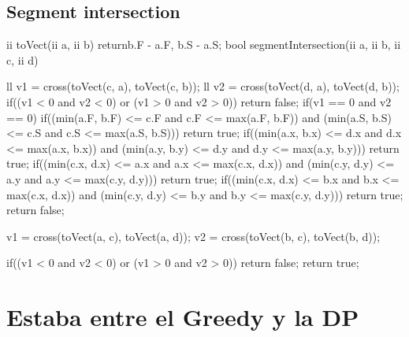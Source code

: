\documentclass[10pt, landscape, twocolumn, a4paper, notitlepage]{article}
\begin{document}
\subsection{Segment intersection}
\begin{code}
ii toVect(ii a, ii b) {
    return{b.F - a.F, b.S - a.S};
} 
bool segmentIntersection(ii a, ii b, ii c, ii d){
    ll v1 = cross(toVect(c, a), toVect(c, b));
    ll v2 = cross(toVect(d, a), toVect(d, b));
    if((v1 < 0 and v2 < 0) or (v1 > 0 and v2 > 0)) {
        return false;
    }
    if(v1 == 0 and v2 == 0) {
        if((min(a.F, b.F) <= c.F and c.F <= max(a.F, b.F)) and
            (min(a.S, b.S) <= c.S and c.S <= max(a.S, b.S))) {
                return true;
            }
        if((min(a.x, b.x) <= d.x and d.x <= max(a.x, b.x)) and
            (min(a.y, b.y) <= d.y and d.y <= max(a.y, b.y))) {
                return true;
            }
        if((min(c.x, d.x) <= a.x and a.x <= max(c.x, d.x)) and
            (min(c.y, d.y) <= a.y and a.y <= max(c.y, d.y))) {
                return true;
            }
        if((min(c.x, d.x) <= b.x and b.x <= max(c.x, d.x)) and
            (min(c.y, d.y) <= b.y and b.y <= max(c.y, d.y))) {
                return true;
            }
        return false;
    }
    
    v1 = cross(toVect(a, c), toVect(a, d));
    v2 = cross(toVect(b, c), toVect(b, d));
    
    if((v1 < 0 and v2 < 0) or (v1 > 0 and v2 > 0)) {
        return false;
    }
    return true;
}
\end{code}
\section{Estaba entre el Greedy y la DP}
\end{document}
